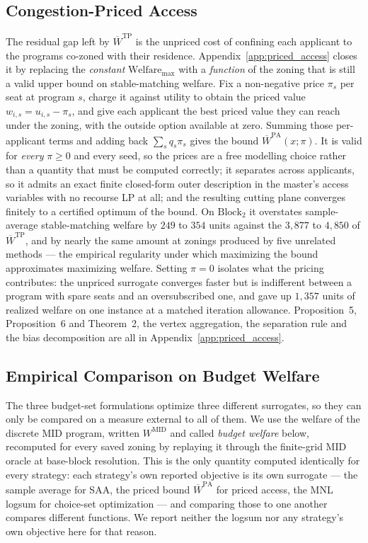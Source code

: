 \documentclass{article}
\begin{document}
\subsection{Congestion-Priced Access}
\label{sec:priced_access}
The residual gap left by $\overline{W}^{\mathrm{TP}}$ is the unpriced cost of confining each applicant to the programs co-zoned with their residence. Appendix~\ref{app:priced_access} closes it by replacing the \emph{constant} $\text{Welfare}_{\max}$ with a \emph{function} of the zoning that is still a valid upper bound on stable-matching welfare. Fix a non-negative price $\pi_s$ per seat at program $s$, charge it against utility to obtain the priced value $w_{i,s} = u_{i,s} - \pi_s$, and give each applicant the best priced value they can reach under the zoning, with the outside option available at zero. Summing those per-applicant terms and adding back $\sum_s q_s \pi_s$ gives the bound $\overline{W}^{\mathrm{PA}}(x; \pi)$. It is valid for \emph{every} $\pi \geq 0$ and every seed, so the prices are a free modelling choice rather than a quantity that must be computed correctly; it separates across applicants, so it admits an exact finite closed-form outer description in the master's access variables with no recourse LP at all; and the resulting cutting plane converges finitely to a certified optimum of the bound. On $\text{Block}_2$ it overstates sample-average stable-matching welfare by $249$ to $354$ units against the $3{,}877$ to $4{,}850$ of $\overline{W}^{\mathrm{TP}}$, and by nearly the same amount at zonings produced by five unrelated methods --- the empirical regularity under which maximizing the bound approximates maximizing welfare. Setting $\pi = 0$ isolates what the pricing contributes: the unpriced surrogate converges faster but is indifferent between a program with spare seats and an oversubscribed one, and gave up $1{,}357$ units of realized welfare on one instance at a matched iteration allowance. Proposition~5, Proposition~6 and Theorem~2, the vertex aggregation, the separation rule and the bias decomposition are all in Appendix~\ref{app:priced_access}.

\subsection{Empirical Comparison on Budget Welfare}
The three budget-set formulations optimize three different surrogates, so they can only be compared on a measure external to all of them. We use the welfare of the discrete MID program, written $W^{\mathrm{MID}}$ and called \emph{budget welfare} below, recomputed for every saved zoning by replaying it through the finite-grid MID oracle at base-block resolution. This is the only quantity computed identically for every strategy: each strategy's own reported objective is its own surrogate --- the sample average for SAA, the priced bound $\overline{W}^{\mathrm{PA}}$ for priced access, the MNL logsum for choice-set optimization --- and comparing those to one another compares different functions. We report neither the logsum nor any strategy's own objective here for that reason.
\end{document}
